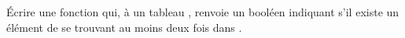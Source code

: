 \question \'Ecrire une fonction  qui, à un tableau , renvoie un booléen indiquant s'il existe un élément de  se trouvant au moins deux fois dans .